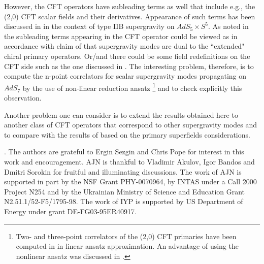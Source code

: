 \documentclass[a4paper,11pt]{article}
\begin{document}
However, the CFT operators have subleading terms as well that
include e.g., the (2,0) CFT scalar fields and their derivatives.
Appearance of such terms has been discussed in \cite{frolov} in
the context of type IIB supergravity on $AdS_5\times S^5$. As
noted in \cite{tran} the subleading terms appearing in the CFT
operator could be viewed as in accordance with claim of
\cite{frolov} that supergravity modes are dual to the ``extended"
chiral primary operators. Or/and there could be some field
redefinitions on the CFT side such as the one discussed in
\cite{gkpr}. The interesting problem, therefore, is to compute the
n-point correlators for scalar supergravity modes propagating on
$AdS_7$ by the use of non-linear reduction ansatz \footnote{Two-
and three-point correlators of the (2,0) CFT primaries have been
computed in \cite{lin} in linear ansatz approximation. An
advantage of using the nonlinear ansatz was discussed in
\cite{nv}.} and to check explicitly this observation.


Another problem one can consider is to extend the results obtained
here to another class of CFT operators that correspond to other
supergravity modes and to compare with the results of
\cite{ferrara} based on the primary superfields considerations.


\vspace{1cm} . \noindent The
authors are grateful to Ergin Sezgin and Chris Pope for interest in
this work and encouragement. AJN is thankful to Vladimir Akulov, Igor Bandos
and Dmitri Sorokin for fruitful and illuminating discussions. The
work of AJN is supported in part by the NSF Grant PHY-0070964,
by INTAS under a Call 2000 Project N254 and by the Ukrainian
Ministry of Science and Education Grant N2.51.1/52-F5/1795-98.
The work of IYP is supported by US Department of Energy under grant
DE-FG03-95ER40917.





\newpage
\end{document}
